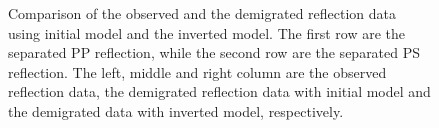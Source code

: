 \documentclass[extra,mreferee]{gji}
\begin{document}
\begin{figure}
   \caption{Comparison of the observed and the demigrated reflection data using
   initial model and the inverted model. The first row are the separated PP
   reflection, while the second row are the separated PS reflection. 
   The left, middle and right column are the observed reflection data, the
   demigrated reflection data with initial model
   and the demigrated data with inverted model, respectively. }
   \label{fig:Data_comparison}
\end{figure}
\end{document}
